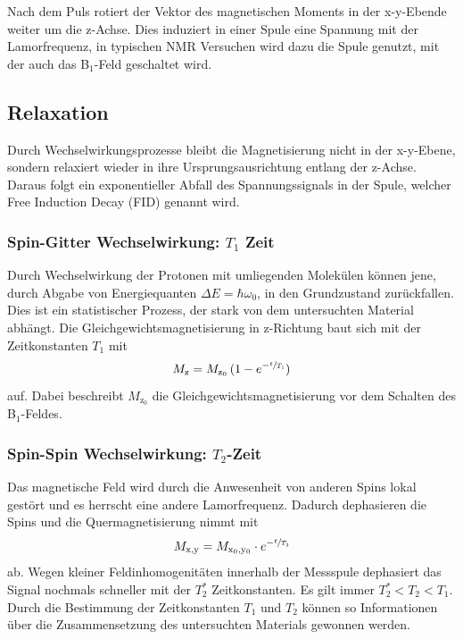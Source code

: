 Nach dem Puls rotiert der Vektor des magnetischen Moments in der x-y-Ebende weiter um die z-Achse.
Dies induziert in einer Spule eine Spannung mit der Lamorfrequenz, in typischen NMR Versuchen wird dazu die Spule genutzt, mit der auch das B$_1$-Feld geschaltet wird.


\subsection{Relaxation}
Durch Wechselwirkungsprozesse bleibt die Magnetisierung nicht in der x-y-Ebene, sondern relaxiert wieder in ihre Ursprungsausrichtung entlang der z-Achse.
Daraus folgt ein exponentieller Abfall des Spannungssignals in der Spule, welcher Free Induction Decay (FID) genannt wird.


\subsubsection{Spin-Gitter Wechselwirkung: $T_1$ Zeit}

Durch Wechselwirkung der Protonen mit umliegenden Molekülen können jene, durch Abgabe von Energiequanten $\Delta E = \hbar \omega_0$, in den Grundzustand zurückfallen.
Dies ist ein statistischer Prozess, der stark von dem untersuchten Material abhängt.
Die Gleichgewichtsmagnetisierung in z-Richtung baut sich mit der Zeitkonstanten $T_1$ mit
\begin{equation}
  M_\text{z} = M_\text{z$_0$} \, (1-e^{-\sfrac{t}{T_1}})
  \label{eqn:T1Zeit}
\end{equation}
auf. Dabei beschreibt $M_\text{z$_0$}$ die Gleichgewichtsmagnetisierung vor dem Schalten des B$_1$-Feldes.


\subsubsection{Spin-Spin Wechselwirkung: $T_2$-Zeit}

Das magnetische Feld wird durch die Anwesenheit von anderen Spins lokal gestört und es herrscht eine andere Lamorfrequenz.
Dadurch dephasieren die Spins und die Quermagnetisierung nimmt mit
\begin{equation}
  M_\text{x,y} = M_\text{x$_0$,y$_0$} \cdot e^{-\sfrac{t}{T_2}}
  \label{eqn:T2Zeit}
\end{equation}
ab.
Wegen kleiner Feldinhomogenitäten innerhalb der Messspule dephasiert das Signal nochmals schneller mit der $T_2^*$ Zeitkonstanten.
Es gilt immer $T_2^*<T_2<T_1$.
Durch die Bestimmung der Zeitkonstanten $T_1$ und $T_2$ können so Informationen über die Zusammensetzung des untersuchten Materials gewonnen werden.

